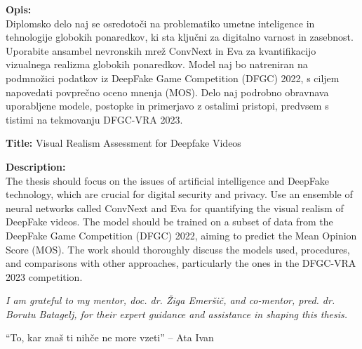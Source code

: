 \documentclass[a4paper,12pt,openright]{book}
\newcommand{\clearemptydoublepage}{\newpage{\pagestyle{empty}\cleardoublepage}}
\begin{document}
\bigskip
\noindent\textbf{Opis:}\\
Diplomsko delo naj se osredotoči na problematiko umetne inteligence in tehnologije globokih ponaredkov, ki sta ključni za digitalno varnost in zasebnost. Uporabite ansambel nevronskih mrež ConvNext in Eva za kvantifikacijo vizualnega realizma globokih ponaredkov. Model naj bo natreniran na podmnožici podatkov iz DeepFake Game Competition (DFGC) 2022, s ciljem napovedati povprečno oceno mnenja (MOS). Delo naj podrobno obravnava uporabljene modele, postopke in primerjavo z ostalimi pristopi, predvsem s tistimi na tekmovanju DFGC-VRA 2023.


\bigskip
\noindent\textbf{Title:} Visual Realism Assessment for Deepfake Videos

\bigskip
\noindent\textbf{Description:}\\
The thesis should focus on the issues of artificial intelligence and DeepFake technology, which are crucial for digital security and privacy. Use an ensemble of neural networks called ConvNext and Eva for quantifying the visual realism of DeepFake videos. The model should be trained on a subset of data from the DeepFake Game Competition (DFGC) 2022, aiming to predict the Mean Opinion Score (MOS). The work should thoroughly discuss the models used, procedures, and comparisons with other approaches, particularly the ones in the DFGC-VRA 2023 competition.

\vfill



\vspace{2cm}

\clearemptydoublepage

\thispagestyle{empty}\mbox{}\vfill\null\it%
\noindent
I am grateful to my mentor, doc. dr. Žiga Emeršič, and co-mentor, pred. dr. Borutu Batagelj, for their expert guidance and assistance in shaping this thesis.
\rm\normalfont

\clearemptydoublepage

\thispagestyle{empty}\mbox{}{\textheight}\mbox{}\hfill\begin{minipage}{0.55\textwidth}%
``To, kar znaš ti nihče ne more vzeti'' -- Ata Ivan

\normalfont\end{minipage}

\clearemptydoublepage

\pagestyle{empty}
\def\thepage{}%
\tableofcontents{}
\end{document}
